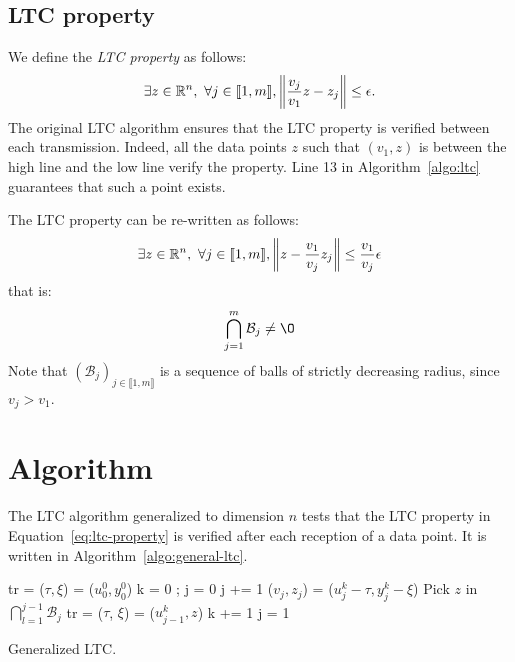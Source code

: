\subsection{LTC property}

We define the \emph{LTC property} as follows:
\begin{equation*}
\exists z \in \mathbb{R}^n, \ \forall j \in \llbracket 1, m \rrbracket, \left\lVert\frac{v_j}{v_1}z-z_j\right\rVert \leq
\epsilon.
\end{equation*}
The original LTC algorithm ensures that the LTC property is
verified between each transmission. Indeed, all the data points
$z$ such that $(v_1, z)$ is between the high line and the low line
verify the property. Line 13 in Algorithm~\ref{algo:ltc} guarantees that
such a point exists.

The LTC property can be re-written as follows:
\begin{equation*}
\exists z \in \mathbb{R}^n, \ \forall j \in \llbracket 1, m \rrbracket, \left\lVert z-\frac{v_1}{v_j}z_j\right\rVert \leq
\frac{v_1}{v_j}\epsilon
\end{equation*}
that is:
\begin{equation}
\bigcap_{j=1}^m \mathcal{B}_j \neq \O
\label{eq:ltc-property}
\end{equation}
Note that $(\mathcal{B}_j)_{j \in \llbracket 1, m \rrbracket}$ is a sequence
of balls of strictly decreasing radius, since $v_j > v_1$.

\section{Algorithm}

The LTC algorithm generalized to dimension $n$ tests that the LTC 
property in Equation~\ref{eq:ltc-property} is verified after each reception of a data 
point. It is written in Algorithm~\ref{algo:general-ltc}.
\begin{algorithm}
\begin{algorithmic}[1]
\Input
\EndInput
\Output
\EndOutput

\State tr = ($\tau, \xi$) = ($u^0_0, y^0_0$) 
\State k = 0 ; j = 0
    \State j += 1
    \State ($v_j, z_j$) = ($u_j^k - \tau, y_j^k - \xi$)
        \State Pick $z$ in $\bigcap_{l=1}^{j-1}{\mathcal{B}_j}$ 
        \State tr = ($\tau$, $\xi$) = ($u^k_{j-1}, z$)
        \State k += 1
        \State j = 1
    \EndIf
\EndWhile
\end{algorithmic}
\caption{Generalized LTC.}
\label{algo:general-ltc}
\end{algorithm}

